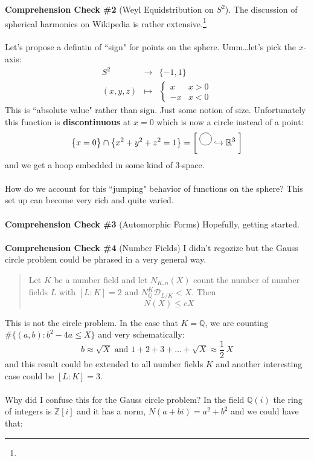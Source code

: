 \documentclass[12pt]{article}
\begin{document}
\noindent \textbf{Comprehension Check \#2} (Weyl Equidstribution on $S^2$). The discussion of spherical harmonics on Wikipedia is rather extensive.\footnote{}\\ \\
Let's propose a defintin of ``sign" for points on the sphere.  Umm\dots let's pick the $x$-axis:
\begin{eqnarray*}
S^2 &\to& \{ -1, 1 \} \\
(x,y,z) & \mapsto &  
\left\{ 
\begin{array}{rc} x & x > 0 \\ -x & x < 0 \end{array} 
\right.
\end{eqnarray*}
This is ``absolute value" rather than sign.  Just some notion of size. Unfortunately this function is \textbf{discontinuous} at $x = 0$ which is now a circle instead of a point:
$$  \big\{  x = 0 \big\}  \cap \big\{ x^2 + y^2 + z^2 = 1\big\} = \left[ \;
\begin{tikz} \draw (0,0) circle (0.25); \end{tikz} \hookrightarrow \mathbb{R}^3 \;\right] $$
and we get a hoop embedded in some kind of 3-space.  \\ \\
How do we account for this ``jumping" behavior of functions on the sphere?  This set up can become very rich and quite varied. \\ \\  
\noindent \textbf{Comprehension Check \#3} (Automorphic Forms) Hopefully, getting started. \\ \\
\noindent \textbf{Comprehension Check \#4} (Number Fields) I didn't regozize but the Gauss circle problem could be phrased in a very general way.  
\begin{quotation}
Let $K$ be a number field and let $N_{K,n}(X)$ count the number of number fields $L$ with $[L:K] = 2$ and $N_\mathbb{Q}^K \mathcal{D}_{L/K} < X $. Then 
$$ N(X) \leq c X $$ 
\end{quotation} 
This is not the circle problem.  In the case that $K = \mathbb{Q}$, we are counting $\# \{ (a,b): b^2 - 4a \leq X \}$ and very schematically:
$$ b \approx \sqrt{X} \text{ and } 1+2+3+\dots + \sqrt{X} \approx \frac{1}{2}\, X $$
and this result could be extended to all number fields $K$ and another interesting case could be $[L:K] = 3$.  \\ \\
Why did I confuse this for the Gauss circle problem?  In the field $\mathbb{Q}(i)$ the ring of integers is $\mathbb{Z}[i]$ and it has a norm, $N(a+bi) =  a^2 + b^2$ and we could have that:
\end{document}
